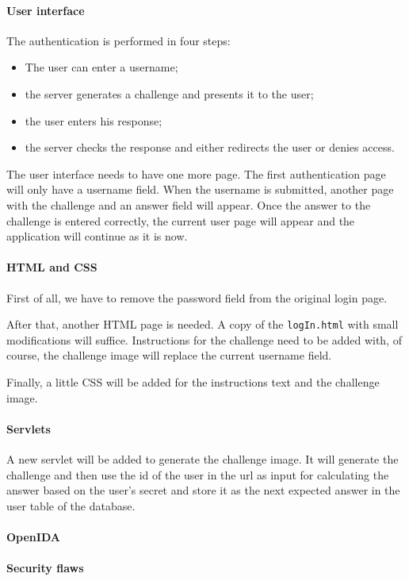\documentclass[11pt,a4paper]{article}
\begin{document}
\paragraph{User interface}
The authentication is performed in four steps:
\begin{itemize}
\item The user can enter a username;
\item the server generates a challenge and presents it to the user;
\item the user enters his response;
\item the server checks the response and either redirects the user or denies access.
\end{itemize}
The user interface needs to have one more page. The first authentication page will only have a username field.  When the username is submitted, another page with the challenge and an answer field will appear. Once the answer to the challenge is entered correctly, the current user page will appear and the application will continue as it is now.

\paragraph{HTML and CSS}
First of all, we have to remove the password field from the original login page.

After that, another HTML page is needed. A copy of the \texttt{logIn.html} with small modifications will suffice. Instructions for the challenge need to be added with, of course, the challenge image will replace the current username
field.

Finally, a little CSS will be added for the instructions text and the challenge image.


\paragraph{Servlets}
A new servlet will be added to generate the challenge image. It will generate the challenge and then use the id of the user in the url as input for
calculating the answer based on the user's secret and store it as the next expected answer in the user table of the database.

\paragraph{OpenIDA}

\paragraph{Security flaws}
\end{document}
